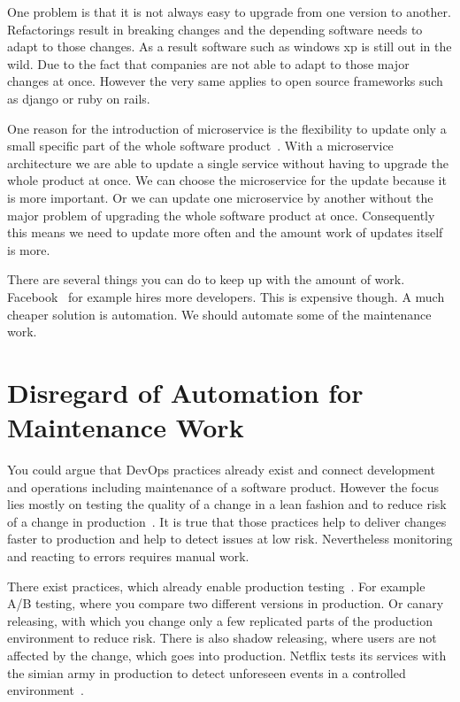 One problem is that it is not always easy to upgrade from one version to
another. Refactorings result in breaking changes and the depending software needs to adapt
to those changes. As a result software such as windows xp is still out in the wild. Due to
the fact that companies are not able to adapt to those major changes at once. However the
very same applies to open source frameworks such as django or ruby on rails.

One reason for the introduction of microservice is the flexibility to update only a small
specific part of the whole software product~\cite{microservices_fowler}. With a
microservice architecture we are able to update a single service without having to upgrade
the whole product at once. We can choose the microservice for the update because it is
more important. Or we can update one microservice by another without the major problem of
upgrading the whole software product at once. Consequently this means we need to update
more often and the amount work of updates itself is more.

There are several things you can do to keep up with the amount of
work. Facebook~\cite{dev_at_fb} for example hires more developers. This is expensive
though. A much cheaper solution is automation. We should automate some of the maintenance
work.

\section{Disregard of Automation for Maintenance Work}

You could argue that DevOps practices already exist and connect development and operations
including maintenance of a software product. However the focus lies mostly on testing the
quality of a change in a lean fashion and to reduce risk of a change in
production~\cite{devops_definition}. It is true that those practices help to deliver
changes faster to production and help to detect issues at low risk. Nevertheless
monitoring and reacting to errors requires manual work.

There exist practices, which already enable production testing~\cite{dev_at_fb}. For
example A/B testing, where you compare two different versions in production. Or canary
releasing, with which you change only a few replicated parts of the production environment
to reduce risk. There is also shadow releasing, where users are not affected by the
change, which goes into production. Netflix tests its services with the simian army in
production to detect unforeseen events in a controlled environment~\cite{antifragile_org}.

